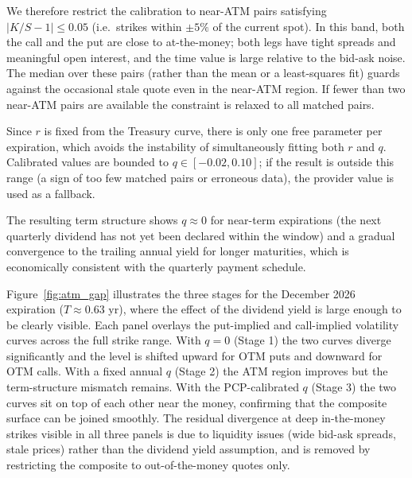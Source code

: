 We therefore restrict the calibration to near-ATM pairs satisfying
$|K/S - 1| \leq 0.05$ (i.e.\ strikes within $\pm 5\%$ of the current spot).
In this band, both the call and the put are close to at-the-money;
both legs have tight spreads and meaningful open interest,
and the time value is large relative to the bid-ask noise.
The median over these pairs (rather than the mean or a least-squares fit)
guards against the occasional stale quote even in the near-ATM region.
If fewer than two near-ATM pairs are available the constraint is relaxed to all matched pairs.

Since $r$ is fixed from the Treasury curve, there is only one free parameter per
expiration, which avoids the instability of simultaneously fitting both $r$ and $q$.
Calibrated values are bounded to $q \in [-0.02, 0.10]$; if the result is outside
this range (a sign of too few matched pairs or erroneous data), the provider value
is used as a fallback.

The resulting term structure shows $q \approx 0$ for near-term expirations
(the next quarterly dividend has not yet been declared within the window)
and a gradual convergence to the trailing annual yield for longer maturities,
which is economically consistent with the quarterly payment schedule.

Figure~\ref{fig:atm_gap} illustrates the three stages for the December 2026 expiration
($T \approx 0.63$ yr), where the effect of the dividend yield is large enough to be
clearly visible.
Each panel overlays the put-implied and call-implied volatility curves across the
full strike range.
With $q = 0$ (Stage 1) the two curves diverge significantly and the level is
shifted upward for OTM puts and downward for OTM calls.
With a fixed annual $q$ (Stage 2) the ATM region improves but the term-structure
mismatch remains.
With the PCP-calibrated $q$ (Stage 3) the two curves sit on top of each other
near the money, confirming that the composite surface can be joined smoothly.
The residual divergence at deep in-the-money strikes visible in all three panels
is due to liquidity issues (wide bid-ask spreads, stale prices) rather than the
dividend yield assumption, and is removed by restricting the composite to
out-of-the-money quotes only.

